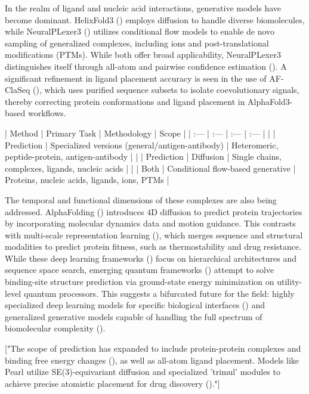 \documentclass[11pt]{article}
\begin{document}
In the realm of ligand and nucleic acid interactions, generative models have become dominant. HelixFold3 (\citep{2408.16975}) employs diffusion to handle diverse biomolecules, while NeuralPLexer3 (\citep{2412.10743}) utilizes conditional flow models to enable de novo sampling of generalized complexes, including ions and post-translational modifications (PTMs). While both offer broad applicability, NeuralPLexer3 distinguishes itself through all-atom and pairwise confidence estimation (\citep{2412.10743}). A significant refinement in ligand placement accuracy is seen in the use of AF-ClaSeq (\citep{2506.00147}), which uses purified sequence subsets to isolate coevolutionary signals, thereby correcting protein conformations and ligand placement in AlphaFold3-based workflows.

| Method | Primary Task | Methodology | Scope |
| :--- | :--- | :--- | :--- |
| \citep{2404.10260} | Prediction | Specialized versions (general/antigen-antibody) | Heteromeric, peptide-protein, antigen-antibody |
| \citep{2408.16975} | Prediction | Diffusion | Single chains, complexes, ligands, nucleic acids |
| \citep{2412.10743} | Both | Conditional flow-based generative | Proteins, nucleic acids, ligands, ions, PTMs |

The temporal and functional dimensions of these complexes are also being addressed. AlphaFolding (\citep{2408.12419}) introduces 4D diffusion to predict protein trajectories by incorporating molecular dynamics data and motion guidance. This contrasts with multi-scale representation learning (\citep{2412.01108}), which merges sequence and structural modalities to predict protein fitness, such as thermostability and drug resistance. While these deep learning frameworks (\citep{2605.11189}) focus on hierarchical architectures and sequence space search, emerging quantum frameworks (\citep{2506.22677}) attempt to solve binding-site structure prediction via ground-state energy minimization on utility-level quantum processors. This suggests a bifurcated future for the field: highly specialized deep learning models for specific biological interfaces (\citep{2404.10260}) and generalized generative models capable of handling the full spectrum of biomolecular complexity (\citep{2412.10743}).

["The scope of prediction has expanded to include protein-protein complexes and binding free energy changes (\citep{2406.03979}), as well as all-atom ligand placement. Models like Pearl utilize SE(3)-equivariant diffusion and specialized 'trimul' modules to achieve precise atomistic placement for drug discovery (\citep{2510.24670})."]
\end{document}
